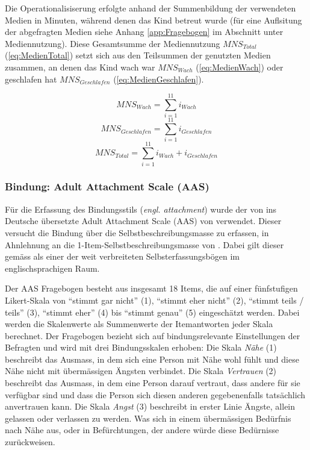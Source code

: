 Die Operationalisiserung erfolgte anhand der Summenbildung der verwendeten Medien in Minuten, während denen das Kind betreut wurde (für eine Auflsitung der abgefragten Medien siehe Anhang \ref{app:Fragebogen} im Abschnitt  unter Mediennutzung). Diese Gesamtsumme der Mediennutzung $MNS_{Total}$ (\ref{eq:MedienTotal}) setzt sich aus den Teilsummen der genutzten  Medien zusammen, an denen das Kind wach war $MNS_{Wach}$ (\ref{eq:MedienWach}) oder geschlafen hat $MNS_{Geschlafen}$ (\ref{eq:MedienGeschlafen}).  

\begin{equation}\label{eq:MedienWach}
    MNS_{Wach}=\sum_{i=1}^{11} i_{Wach}
\end{equation}
\begin{equation}\label{eq:MedienGeschlafen}
    MNS_{Geschlafen}=\sum_{i=1}^{11} i_{Geschlafen}
\end{equation}
\begin{equation}\label{eq:MedienTotal}
    MNS_{Total}=\sum_{i=1}^{11} i_{Wach} + i_{Geschlafen}
\end{equation}

\subsubsection{Bindung: Adult Attachment Scale (AAS)}\label{sec:AAS}
Für die Erfassung des Bindungsstils (\textit{engl. attachment}) wurde der von  ins Deutsche übersetzte Adult Attachment Scale (AAS) von  verwendet. Dieser versucht die Bindung über die Selbstbeschreibungsmasse zu erfassen, in Ahnlehnung an die 1-Item-Selbstbeschreibungsmasse von . Dabei gilt dieser gemäss  als einer der weit verbreiteten Selbsterfassungsbögen im englischsprachigen Raum.

Der AAS Fragebogen besteht aus insgesamt 18 Items, die auf einer fünfstufigen Likert-Skala von \enquote{stimmt gar nicht} (1), \enquote{stimmt eher nicht} (2), \enquote{stimmt teils / teils} (3), \enquote{stimmt eher} (4) bis \enquote{stimmt genau} (5) eingeschätzt werden. Dabei werden die Skalenwerte als Summenwerte der Itemantworten jeder Skala berechnet. Der Fragebogen bezieht sich auf bindungsrelevante Einstellungen der Befragten und wird mit drei Bindungsskalen erhoben: Die Skala \textit{Nähe} (1) beschreibt das Ausmass, in dem sich eine Person mit Nähe wohl fühlt und diese Nähe nicht mit übermässigen Ängsten verbindet. Die Skala \textit{Vertrauen} (2) beschreibt das Ausmass, in dem eine Person darauf vertraut, dass andere für sie verfügbar sind und dass die Person sich diesen anderen gegebenenfalls tatsächlich anvertrauen kann. Die Skala \textit{Angst} (3) beschreibt in erster Linie Ängste, allein gelassen oder verlassen zu werden. Was sich in einem übermässigen Bedürfnis nach Nähe aus, oder in Befürchtungen, der andere würde diese Bedürnisse zurückweisen. 

